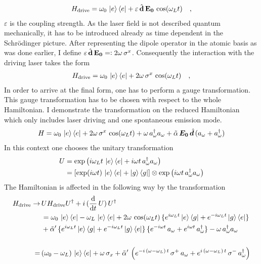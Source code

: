 \begin{align*}
    H_\text{drive} = \omega_0\,\ket{e}\bra{e}+ \varepsilon\,\hat{\mathbf{d}}\,\mathbf{E_0}\,\cos(\omega_Lt)\quad,
\end{align*} 
$\varepsilon$ is the coupling strength. As the laser field is not described quantum mechanically, it has to be introduced already as time dependent in the Schrödinger picture. After representing the dipole operator in the atomic basis as was done earlier, I define $\varepsilon\,\hat{\mathbf{d}}\,\mathbf{E_0}=\vcentcolon2\omega\,\sigma^x$. Consequently the interaction with the driving laser takes the form
\begin{align*}
    H_\text{drive} = \omega_0\,\ket{e}\bra{e}+ 2\omega\,\sigma^x\,\cos(\omega_Lt)\quad,
\end{align*}
In order to arrive at the final form, one has to perform a gauge transformation. This gauge transformation has to be chosen with respect to the whole Hamiltonian. I demonstrate the transformation on the reduced Hamiltonian which only includes laser driving and one spontaneous emission mode.
\begin{align*}
    H = \omega_0\,\ket{e}\bra{e}+ 2\omega\,\sigma^x\,\cos(\omega_Lt)+\omega\,a^\dagger_\omega a_\omega+ \tilde{\alpha}\,\boldsymbol{E_0}\,\hat{\boldsymbol{d}}\,(a_\omega+a^\dagger_\omega)
\end{align*}
In this context one chooses the unitary transformation 
\begin{align*}
    U&=\exp\left(i\omega_L t\,\ket{e}\bra{e}+i\omega t\,a_\omega^\dagger a_\omega\right)\\
    &=\left[ \exp(i\omega t)\,\ket{e}\bra{e}+\ket{g}\bra{g} \right]\otimes \exp\left( i\omega t\,a_\omega^\dagger a_\omega \right)
\end{align*}
The Hamiltonian is affected in the following way by the transformation
\begin{align*}
    H_\text{drive}\rightarrow \,&UH_\text{drive}U^\dagger+i\,(\frac{\text{d}}{\text{d} t}\,U)\,U^\dagger\\
    &=\omega_0\,\ket{e}\bra{e}-\omega_L\,\ket{e}\bra{e} + 2\omega\,\cos(\omega_L t)\,\{e^{i\omega_L t} \ket{e}\bra{g}+e^{-i\omega_L t}\ket{g}\bra{e}\}\\
    &+\tilde{\alpha}'\,\{e^{i\omega_L t} \ket{e}\bra{g}+e^{-i\omega_L t}\ket{g}\bra{e}\}\,\{ e^{-i\omega t} \,a_\omega+e^{i\omega t}\,a_\omega^\dagger  \}-\omega\,a^\dagger_\omega a_\omega\\\\
    =\,&(\omega_0-\omega_L)\,\ket{e}\bra{e}+\omega\,\sigma_x+\tilde{\alpha}'\,\left( e^{-i\,(\omega-\omega_L)\, t}\,\sigma^+\,a_\omega+e^{i\,(\omega-\omega_L)\, t}\,\sigma^-\,a^\dagger_\omega \right)
\end{align*}

